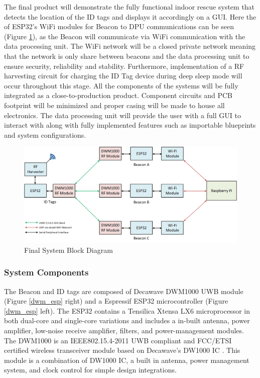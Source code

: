 The final product will demonstrate the fully functional indoor rescue system that detects the location of the ID tags and displays it accordingly on a GUI. Here the of ESP32’s WiFi modules for Beacon to DPU communications can be seen (Figure \ref{final}), as the Beacon will communicate via WiFi communication with the data processing unit. The WiFi network will be a closed private network meaning that the network is only share between beacons and the data processing unit to ensure security, reliability and stability. Furthermore, implementation of a RF harvesting circuit for charging the ID Tag device during deep sleep mode will occur throughout this stage. All the components of the systems will be fully integrated as a close-to-production product. Component circuits and \Gls{PCB} footprint will be minimized and proper casing will be made to house all electronics. The data processing unit will provide the user with a full GUI to interact with along with fully implemented features such as importable blueprints and system configurations.

\bigskip
\begin{figure}[H]
\centering
    \includegraphics[width=\linewidth]{./images/03_final.png}
    \caption{Final System Block Diagram}
    \label{final}
\end{figure}

\pagebreak
\subsubsection{System Components}
\medskip
The Beacon and ID tags are composed of Decawave DWM1000 \Gls{UWB} module (Figure \ref{dwm_esp} right) and a Espressif ESP32 microcontroller (Figure \ref{dwm_esp} left). The ESP32 contains a Tensilica Xtensa LX6 microprocessor in both dual-core and single-core variations and includes a in-built antenna, power amplifier, low-noise receive amplifier, filters, and power-management modules. The DWM1000 is an IEEE802.15.4-2011 UWB compliant and \Gls{FCC}/\Gls{ETSI} certified wireless transceiver module based on Decawave’s DW1000 IC \cite{R2-1-1-1}. This module is a combination of DW1000 \Gls{IC}, a built in antenna, power management system, and clock control for simple design integrations. 

